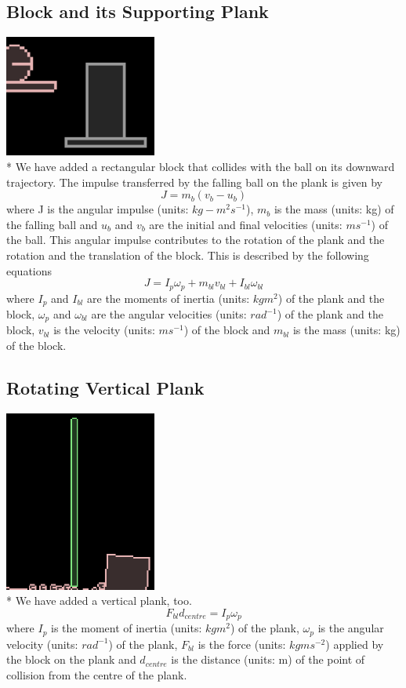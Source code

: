 \documentclass{article}
\begin{document}
\subsection{Block and its Supporting Plank}
\includegraphics[width=5cm]{_-1}
\\*
\hspace{1 cm}
We have added a rectangular block that collides with the ball on its downward trajectory.
The impulse transferred by the falling ball on the plank is given by
\begin{equation}
 	J = m_b(v_b - u_b)
\end{equation}
where J is the angular impulse (units: $kg-m^2s^{-1}$), $m_b$ is the mass (units: kg) of the falling ball and $u_b$ and $v_b$ are the initial and final velocities (units: $ms^{-1}$) of the ball.
This angular impulse contributes to the rotation of the plank and the rotation and the translation of the block. This is described by the following equations
\begin{equation}
 	J = I_p \omega_p + m_{bl} v_{bl} + I_{bl} \omega_{bl}
\end{equation}
where $I_p$ and $I_{bl}$ are the moments of inertia (units: $kgm^2$) of the plank and the block, $\omega_p$ and $\omega_{bl}$ are the angular velocities (units: $rad^{-1}$) of the plank and the block, $v_{bl}$ is the velocity (units: $ms^{-1}$) of the block and $m_{bl}$ is the mass (units: kg) of the block. 


\subsection{Rotating Vertical Plank}
\includegraphics[width=5cm]{_-2}
\\*
\hspace{1 cm}
We have added a vertical plank, too.
\begin{equation}
	F_{bl} d_{centre} = I_p \omega_p
\end{equation}
where $I_p$ is the moment of inertia (units: $kgm^2$) of the plank, $\omega_p$ is the angular velocity (units: $rad^{-1}$) of the plank, $F_{bl}$ is the force (units: $kgms^{-2}$) applied by the block on the plank and $d_{centre}$ is the distance (units: m) of the point of collision from the centre of the plank. 
\end{document}
